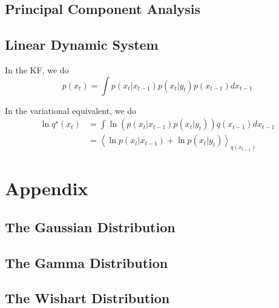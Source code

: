 \documentclass{article}
\begin{document}
\subsection{Principal Component Analysis}

\subsection{Linear Dynamic System}
In the KF, we do
\begin{equation}
p(x_t) = \int p(x_t | x_{t-1}) p(x_t | y_t) p(x_{t-1}) d x_{t-1}
\end{equation}

In the variational equivalent, we do
\begin{equation}
\begin{split}
\ln q^\star(x_t) &= \int \ln \left( p(x_t | x_{t-1}) p(x_t | y_t) \right) q(x_{t-1}) d x_{t-1}\\
            &= \left<  \ln  p(x_t | x_{t-1})  + \ln p(x_t | y_t)  \right>_{q(x_{t-1})}
\end{split}
\end{equation}


\section{Appendix}
\subsection{The Gaussian Distribution}
\subsection{The Gamma Distribution}
\subsection{The Wishart Distribution}
\end{document}
